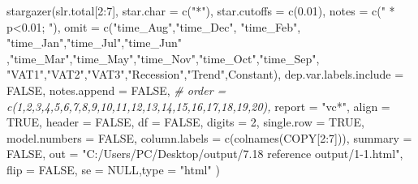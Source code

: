 \documentclass[
]{article}
\newenvironment{Shaded}{\begin{snugshade}}{\end{snugshade}}
\newcommand{\AttributeTok}[1]{\textcolor[rgb]{0.77,0.63,0.00}{#1}}
\newcommand{\CommentTok}[1]{\textcolor[rgb]{0.56,0.35,0.01}{\textit{#1}}}
\newcommand{\ConstantTok}[1]{\textcolor[rgb]{0.00,0.00,0.00}{#1}}
\newcommand{\DecValTok}[1]{\textcolor[rgb]{0.00,0.00,0.81}{#1}}
\newcommand{\FloatTok}[1]{\textcolor[rgb]{0.00,0.00,0.81}{#1}}
\newcommand{\FunctionTok}[1]{\textcolor[rgb]{0.00,0.00,0.00}{#1}}
\newcommand{\NormalTok}[1]{#1}
\newcommand{\SpecialCharTok}[1]{\textcolor[rgb]{0.00,0.00,0.00}{#1}}
\newcommand{\StringTok}[1]{\textcolor[rgb]{0.31,0.60,0.02}{#1}}
\begin{document}
\begin{Shaded}
\begin{Highlighting}[]
\FunctionTok{stargazer}\NormalTok{(slr.total[}\DecValTok{2}\SpecialCharTok{:}\DecValTok{7}\NormalTok{],}
          \AttributeTok{star.char =} \FunctionTok{c}\NormalTok{(}\StringTok{"*"}\NormalTok{),}
          \AttributeTok{star.cutoffs =} \FunctionTok{c}\NormalTok{(}\FloatTok{0.01}\NormalTok{),}
          \AttributeTok{notes =} \FunctionTok{c}\NormalTok{(}\StringTok{" * p\textless{}0.01; "}\NormalTok{),}
          \AttributeTok{omit =} \FunctionTok{c}\NormalTok{(}\StringTok{"time\_Aug"}\NormalTok{,}\StringTok{"time\_Dec"}\NormalTok{, }\StringTok{"time\_Feb"}\NormalTok{, }\StringTok{"time\_Jan"}\NormalTok{,}\StringTok{"time\_Jul"}\NormalTok{,}\StringTok{"time\_Jun"}\NormalTok{ ,}\StringTok{"time\_Mar"}\NormalTok{,}\StringTok{"time\_May"}\NormalTok{,}\StringTok{"time\_Nov"}\NormalTok{,}\StringTok{"time\_Oct"}\NormalTok{,}\StringTok{"time\_Sep"}\NormalTok{,}
                   \StringTok{"VAT1"}\NormalTok{,}\StringTok{"VAT2"}\NormalTok{,}\StringTok{"VAT3"}\NormalTok{,}\StringTok{"Recession"}\NormalTok{,}\StringTok{"Trend"}\NormalTok{,}\StringTok{\textquotesingle{}Constant\textquotesingle{}}\NormalTok{),}
          \AttributeTok{dep.var.labels.include =} \ConstantTok{FALSE}\NormalTok{,}
          \AttributeTok{notes.append =} \ConstantTok{FALSE}\NormalTok{,}
          \CommentTok{\# order = c(1,2,3,4,5,6,7,8,9,10,11,12,13,14,15,16,17,18,19,20),}
          \AttributeTok{report =} \StringTok{"vc*"}\NormalTok{,}
          \AttributeTok{align =} \ConstantTok{TRUE}\NormalTok{,}
          \AttributeTok{header =} \ConstantTok{FALSE}\NormalTok{,}
          \AttributeTok{df =} \ConstantTok{FALSE}\NormalTok{,}
          \AttributeTok{digits =} \DecValTok{2}\NormalTok{, }\AttributeTok{single.row =} \ConstantTok{TRUE}\NormalTok{,}
          \AttributeTok{model.numbers =} \ConstantTok{FALSE}\NormalTok{,}
          \AttributeTok{column.labels =} \FunctionTok{c}\NormalTok{(}\FunctionTok{colnames}\NormalTok{(COPY[}\DecValTok{2}\SpecialCharTok{:}\DecValTok{7}\NormalTok{])),}
          \AttributeTok{summary =} \ConstantTok{FALSE}\NormalTok{,}
          \AttributeTok{out =} \StringTok{"C:/Users/PC/Desktop/output/7.18 reference output/1{-}1.html"}\NormalTok{,}
          \AttributeTok{flip =} \ConstantTok{FALSE}\NormalTok{,}
          \AttributeTok{se =} \ConstantTok{NULL}\NormalTok{,}\AttributeTok{type =} \StringTok{"html"}
\NormalTok{)}
\end{Highlighting}
\end{Shaded}
\end{document}
